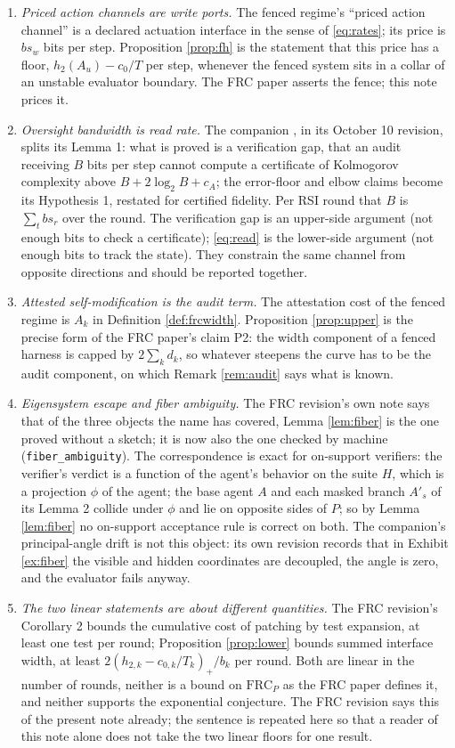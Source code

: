 \documentclass[11pt]{article}
\theoremstyle{definition}
\theoremstyle{remark}
\newcommand{\Au}{A_u}
\newcommand{\htwo}{h_2}
\newcommand{\sr}{s_r}
\newcommand{\sw}{s_w}
\begin{document}
\begin{enumerate}
\item \emph{Priced action channels are write ports.} The fenced regime's ``priced action channel'' is a declared actuation interface in the sense of \eqref{eq:rates}; its price is $b\sw$ bits per step. Proposition \ref{prop:fh} is the statement that this price has a floor, $\htwo(\Au)-c_0/T$ per step, whenever the fenced system sits in a collar of an unstable evaluator boundary. The FRC paper asserts the fence; this note prices it.
\item \emph{Oversight bandwidth is read rate.} The companion \cite{dugan2025collapse}, in its October 10 revision, splits its Lemma 1: what is proved is a verification gap, that an audit receiving $B$ bits per step cannot compute a certificate of Kolmogorov complexity above $B+2\log_2B+c_A$; the error-floor and elbow claims become its Hypothesis 1, restated for certified fidelity. Per RSI round that $B$ is $\sum_tb\sr$ over the round. The verification gap is an upper-side argument (not enough bits to check a certificate); \eqref{eq:read} is the lower-side argument (not enough bits to track the state). They constrain the same channel from opposite directions and should be reported together.
\item \emph{Attested self-modification is the audit term.} The attestation cost of the fenced regime is $A_k$ in Definition \ref{def:frcwidth}. Proposition \ref{prop:upper} is the precise form of the FRC paper's claim P2: the width component of a fenced harness is capped by $2\sum_kd_k$, so whatever steepens the curve has to be the audit component, on which Remark \ref{rem:audit} says what is known.
\item \emph{Eigensystem escape and fiber ambiguity.} The FRC revision's own note says that of the three objects the name has covered, Lemma \ref{lem:fiber} is the one proved without a sketch; it is now also the one checked by machine (\texttt{fiber\_ambiguity}). The correspondence is exact for on-support verifiers: the verifier's verdict is a function of the agent's behavior on the suite $H$, which is a projection $\phi$ of the agent; the base agent $A$ and each masked branch $A'_s$ of its Lemma 2 collide under $\phi$ and lie on opposite sides of $P$; so by Lemma \ref{lem:fiber} no on-support acceptance rule is correct on both. The companion's principal-angle drift is not this object: its own revision records that in Exhibit \ref{ex:fiber} the visible and hidden coordinates are decoupled, the angle is zero, and the evaluator fails anyway.
\item \emph{The two linear statements are about different quantities.} The FRC revision's Corollary 2 bounds the cumulative cost of patching by test expansion, at least one test per round; Proposition \ref{prop:lower} bounds summed interface width, at least $2(h_{2,k}-c_{0,k}/T_k)_+/b_k$ per round. Both are linear in the number of rounds, neither is a bound on $\mathrm{FRC}_P$ as the FRC paper defines it, and neither supports the exponential conjecture. The FRC revision says this of the present note already; the sentence is repeated here so that a reader of this note alone does not take the two linear floors for one result.
\end{enumerate}
\end{document}
